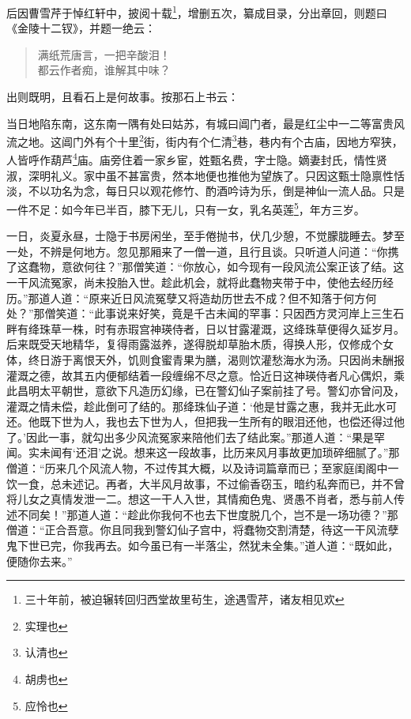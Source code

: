 \documentclass[12pt,oneside]{book}
\newenvironment{shici}{%
\begin{verse}%
\centering\large\hspace{12pt}}%
{\end{verse}}
\begin{document}
后因曹雪芹于悼红轩中，披阅十载\footnote{三十年前，被迫辗转回归西堂故里茍生，途遇雪芹，诸友相见欢}，增删五次，纂成目录，分出章回，则题曰《金陵十二钗》，并题一绝云：

\begin{shici}
满纸荒唐言，一把辛酸泪！\\
都云作者痴，谁解其中味？
\end{shici}


出则既明，且看石上是何故事。按那石上书云：

当日地陷东南，这东南一隅有处曰姑苏，有城曰阊门者，最是红尘中一二等富贵风流之地。这阊门外有个十里\footnote{实理也}街，街内有个仁清\footnote{认清也}巷，巷内有个古庙，因地方窄狭，人皆呼作葫芦\footnote{胡虏也}庙。庙旁住着一家乡宦，姓甄名费，字士隐。嫡妻封氏，情性贤淑，深明礼义。家中虽不甚富贵，然本地便也推他为望族了。只因这甄士隐禀性恬淡，不以功名为念，每日只以观花修竹、酌酒吟诗为乐，倒是神仙一流人品。只是一件不足：如今年已半百，膝下无儿，只有一女，乳名英莲\footnote{应怜也}，年方三岁。

一日，炎夏永昼，士隐于书房闲坐，至手倦抛书，伏几少憩，不觉朦胧睡去。梦至一处，不辨是何地方。忽见那厢来了一僧一道，且行且谈。只听道人问道：“你携了这蠢物，意欲何往？”那僧笑道：“你放心，如今现有一段风流公案正该了结。这一干风流冤家，尚未投胎入世。趁此机会，就将此蠢物夹带于中，使他去经历经历。”那道人道：“原来近日风流冤孽又将造劫历世去不成？但不知落于何方何处？”那僧笑道：“此事说来好笑，竟是千古未闻的罕事：只因西方灵河岸上三生石畔有绛珠草一株，时有赤瑕宫神瑛侍者，日以甘露灌溉，这绛珠草便得久延岁月。后来既受天地精华，复得雨露滋养，遂得脱却草胎木质，得换人形，仅修成个女体，终日游于离恨天外，饥则食蜜青果为膳，渴则饮灌愁海水为汤。只因尚未酬报灌溉之德，故其五内便郁结着一段缠绵不尽之意。恰近日这神瑛侍者凡心偶炽，乘此昌明太平朝世，意欲下凡造历幻缘，已在警幻仙子案前挂了号。警幻亦曾问及，灌溉之情未偿，趁此倒可了结的。那绛珠仙子道：‘他是甘露之惠，我并无此水可还。他既下世为人，我也去下世为人，但把我一生所有的眼泪还他，也偿还得过他了。’因此一事，就勾出多少风流冤家来陪他们去了结此案。”那道人道：“果是罕闻。实未闻有‘还泪’之说。想来这一段故事，比历来风月事故更加琐碎细腻了。”那僧道：“历来几个风流人物，不过传其大概，以及诗词篇章而已；至家庭闺阁中一饮一食，总未述记。再者，大半风月故事，不过偷香窃玉，暗约私奔而已，并不曾将儿女之真情发泄一二。想这一干人入世，其情痴色鬼、贤愚不肖者，悉与前人传述不同矣！”那道人道：“趁此你我何不也去下世度脱几个，岂不是一场功德？”那僧道：“正合吾意。你且同我到警幻仙子宫中，将蠢物交割清楚，待这一干风流孽鬼下世已完，你我再去。如今虽已有一半落尘，然犹未全集。”道人道：“既如此，便随你去来。”
\end{document}
